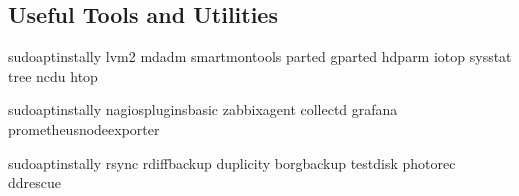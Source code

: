 \documentclass[letterpaper,10pt,english]{sphinxmanual}
\begin{document}
\subsection{Useful Tools and Utilities}
\label{\detokenize{downloads:useful-tools-and-utilities}}
\sphinxAtStartPar
{}

\begin{sphinxVerbatim}[commandchars=\\\{\}]
sudoaptinstall\PYGZhy{}y
lvm2
mdadm
smartmontools
parted
gparted
hdparm
iotop
sysstat
tree
ncdu
htop
\end{sphinxVerbatim}

\sphinxAtStartPar
{}

\begin{sphinxVerbatim}[commandchars=\\\{\}]
sudoaptinstall\PYGZhy{}y
nagios\PYGZhy{}plugins\PYGZhy{}basic
zabbix\PYGZhy{}agent
collectd
grafana
prometheus\PYGZhy{}node\PYGZhy{}exporter
\end{sphinxVerbatim}

\sphinxAtStartPar
{}

\begin{sphinxVerbatim}[commandchars=\\\{\}]
sudoaptinstall\PYGZhy{}y
rsync
rdiff\PYGZhy{}backup
duplicity
borgbackup
testdisk
photorec
ddrescue
\end{sphinxVerbatim}
\end{document}
